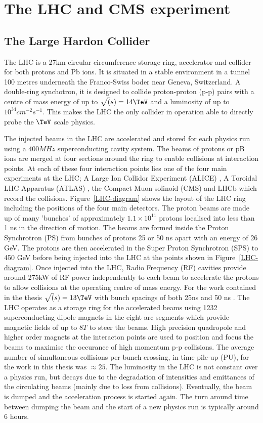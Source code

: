 
\chapter{The LHC and CMS experiment} %
\section{The Large Hardon Collider}
\label{lhc_intro}
The LHC is a 27km circular circumference storage ring, accelerator and collider for 
both protons and Pb ions. It is situated in a stable environment in a tunnel 
100 metres underneath the Franco-Swiss boder near Geneva, Switzerland.
A double-ring synchotron, it is designed to collide proton-proton (p-p)
pairs with a centre of mass energy of up to $\sqrt(s)=14\TeV$ and a 
luminosity of up to $10^{34}cm^{-2}s^{-1}$. This makes the LHC the only collider
in operation able to directly probe the $\TeV$ scale physics. 

The injected beams in the LHC are accelerated and stored for each physics run using 
a $400MHz$ superconducting cavity system. The beams of protons or pB ions 
are merged at four sections around the ring to enable collisions at interaction points.
At each of these four interaction points lies one of the four main 
experiments at the LHC; A Large Ion Collidor Experiment (ALICE) \cite{ALICE},
A Toroidal LHC Apparatus (ATLAS) \cite{ATLAS}, the Compact Muon solinoid (CMS) \cite{CMS}
and LHCb which record the collisions. Figure~\ref{LHC-diagram} shows the layout of the LHC ring including
the positions of the four main detectors. The proton beams are made up of many 'bunches' of approximately $1.1\times10^{11}$
protons localised into less than 1 ns in the direction of motion.
The beams are formed inside the Proton Synchrotron (PS) from bunches of protons 25 or 50 ns apart with an energy of 26 GeV. 
The protons are then accelerated in the Super Proton Synchrotron (SPS) to 450 GeV before being injected into the LHC at
the points shown in Figure~\ref{LHC-diagram}. Once injected into the LHC, Radio Frequency (RF) cavities 
provide around 275kW of RF power independently to each beam to accelerate the protons to allow collisions
at the operating centre of mass energy. For the work contained in the thesis $\sqrt(s) = 13\TeV$ with bunch spacings of both
25ns and 50 ns \cite{LHC}. The LHC operates as a storage ring for the accelerated beams using 1232 
superconducting dipole magnets in the eight arc segments which provide magnetic fields of up to $8T$ to steer the beams. 
High precision quadropole and higher order magnets at the interacton points are used to position and focus the beams to 
maximise the occurance of high momentum p-p collisions. The average number of simultaneous collisions
per bunch crossing, in time pile-up (PU), for the work in this thesis was $\approx25$.
The luminosity in the LHC is not constant over a physics run, but decays due to the degradation 
of intensities and emittances of the circulating beams (mainly due to loss from collisions). Eventually,
the beam is dumped and the acceleration process is started again. The turn around time between dumping
the beam and the start of a new physics run is typically around 6 hours.

